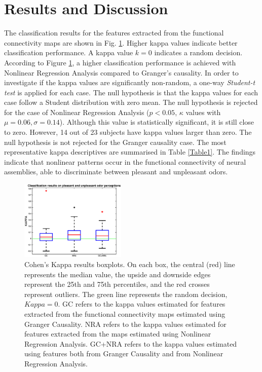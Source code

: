\section{Results and Discussion}

The classification results for the features extracted from the functional connectivity maps are shown in Fig. \ref{fig:kappa}. Higher kappa values indicate better classification performance. A kappa value $k=0$ indicates a random decision. According to Figure \ref{fig:kappa}, a higher classification performance is achieved with Nonlinear Regression Analysis compared to Granger's causality. In order to investigate if the kappa values are significantly non-random, a one-way \emph{Student-t test} is applied for each case. The null hypothesis is that the kappa values for each case follow a Student distribution with zero mean. The null hypothesis is rejected for the case of Nonlinear Regression Analysis ($p<0.05$, $\kappa$ values with $\mu = 0.06, \sigma = 0.14$). Although this value is statistically significant, it is still close to zero. However, 14 out of 23 subjects have kappa values larger than zero. The null hypothesis is not rejected for the Granger causality case. The most representative kappa descriptives are summarised in Table \ref{Table1}. The findings indicate that nonlinear patterns occur in the functional connectivity of neural assemblies, able to discriminate between pleasant and unpleasant odors. 

\begin{figure}[t]
    \centering
    \includegraphics[width=0.45\textwidth]{./images/kappa.eps}
    \caption{Cohen's Kappa results boxplots. On each box, the central (red) line represents the median value, the upside and downside edges represent the 25th and 75th percentiles, and the red crosses represent outliers. The green line represents the random decision, $Kappa=0$. GC refers to the kappa values estimated for features extracted from the functional connectivity maps estimated using Granger Causality. NRA refers to the kappa values estimated for features extracted from the maps estimated using Nonlinear Regression Analysis. GC+NRA refers to the kappa values estimated using features both from Granger Causality and from Nonlinear Regression Analysis.}
    \label{fig:kappa}
\end{figure}

